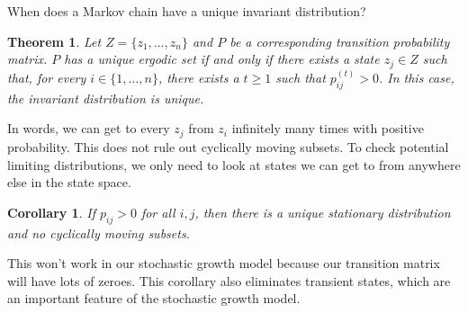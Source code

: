 \documentclass[11pt]{article}
\newtheorem*{theorem}{Theorem}
\newtheorem*{corollary}{Corollary}
\begin{document}
When does a Markov chain have a unique invariant distribution?
\begin{theorem}
Let $Z = \{z_1, \ldots, z_n\}$ and $P$ be a corresponding transition probability matrix. $P$ has a unique ergodic set if and only if there exists a state $z_j \in Z$ such that, for every $i \in \{1, \ldots, n\}$, there exists a $t \ge 1$ such that $p_{ij}^{(t)} > 0$. In this case, the invariant distribution is unique.
\end{theorem}
In words, we can get to every \(z_j\) from \(z_i\) infinitely many times with positive probability. This does not rule out cyclically moving subsets. To check potential limiting distributions, we only need to look at states we can get to from anywhere else in the state space.
\begin{corollary}
If $p_{ij} > 0$ for all $i, j$, then there is a unique stationary distribution  and no cyclically moving subsets.
\end{corollary}
This won't work in our stochastic growth model because our transition matrix will have lots of zeroes. This corollary also eliminates transient states, which are an important feature of the stochastic growth model.
\end{document}
